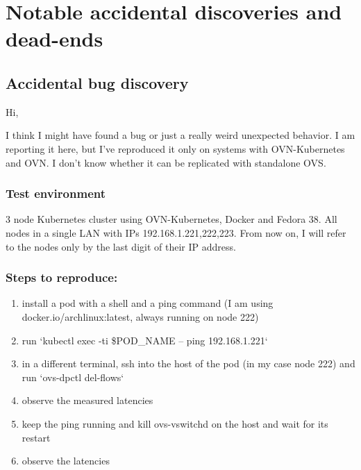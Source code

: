 \chapter{Notable accidental discoveries and dead-ends}
\label{chap:accidents}


\section{Accidental bug discovery}

Hi,

I think I might have found a bug or just a really weird unexpected behavior. I am reporting it here, but I've reproduced it only on systems with OVN-Kubernetes and OVN. I don't know whether it can be replicated with standalone OVS.


\subsection{Test environment}


3 node Kubernetes cluster using OVN-Kubernetes, Docker and Fedora 38. All nodes in a single LAN with IPs 192.168.1.{221,222,223}. From now on, I will refer to the nodes only by the last digit of their IP address.


\subsection{Steps to reproduce:}


\begin{enumerate}
\item install a pod with a shell and a ping command (I am using docker.io/archlinux:latest, always running on node 222)
\item run `kubectl exec -ti \$POD\_NAME -- ping 192.168.1.221`
\item in a different terminal, ssh into the host of the pod (in my case node 222) and run `ovs-dpctl del-flows`
\item observe the measured latencies
\item keep the ping running and kill ovs-vswitchd on the host and wait for its restart
\item observe the latencies
\end{enumerate}


